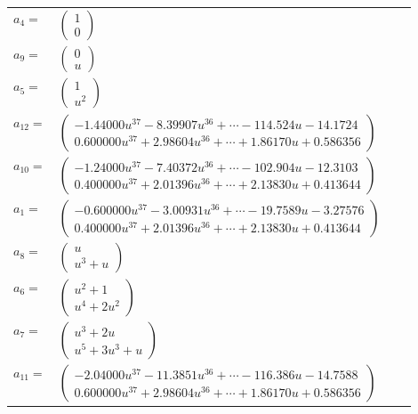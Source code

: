 \documentclass[1p]{elsarticle_modified}
\theoremstyle{definition}
\begin{document}
\begin{tabular}{m{7pt} m{180pt} m{7pt} m{180pt} }
\flushright $a_{4}=$&$\begin{pmatrix}1\\0\end{pmatrix}$ \\
\flushright $a_{9}=$&$\begin{pmatrix}0\\u\end{pmatrix}$ \\
\flushright $a_{5}=$&$\begin{pmatrix}1\\u^2\end{pmatrix}$ \\
\flushright $a_{12}=$&$\begin{pmatrix}-1.44000 u^{37}-8.39907 u^{36}+\cdots-114.524 u-14.1724\\0.600000 u^{37}+2.98604 u^{36}+\cdots+1.86170 u+0.586356\end{pmatrix}$ \\
\flushright $a_{10}=$&$\begin{pmatrix}-1.24000 u^{37}-7.40372 u^{36}+\cdots-102.904 u-12.3103\\0.400000 u^{37}+2.01396 u^{36}+\cdots+2.13830 u+0.413644\end{pmatrix}$ \\
\flushright $a_{1}=$&$\begin{pmatrix}-0.600000 u^{37}-3.00931 u^{36}+\cdots-19.7589 u-3.27576\\0.400000 u^{37}+2.01396 u^{36}+\cdots+2.13830 u+0.413644\end{pmatrix}$ \\
\flushright $a_{8}=$&$\begin{pmatrix}u\\u^3+u\end{pmatrix}$ \\
\flushright $a_{6}=$&$\begin{pmatrix}u^2+1\\u^4+2 u^2\end{pmatrix}$ \\
\flushright $a_{7}=$&$\begin{pmatrix}u^3+2 u\\u^5+3 u^3+u\end{pmatrix}$ \\
\flushright $a_{11}=$&$\begin{pmatrix}-2.04000 u^{37}-11.3851 u^{36}+\cdots-116.386 u-14.7588\\0.600000 u^{37}+2.98604 u^{36}+\cdots+1.86170 u+0.586356\end{pmatrix}$ \\

\end{tabular}
\end{document}
